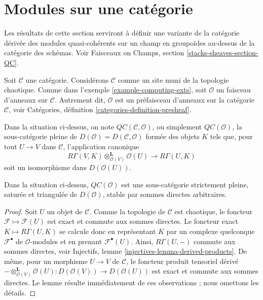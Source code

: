\section{Modules sur une catégorie}
\label{section-modules-cohomology}

\noindent
Les résultats de cette section serviront à définir une variante de la
catégorie dérivée des modules quasi-cohérents sur un champ en groupoïdes
au-dessus de la catégorie des schémas. Voir Faisceaux on Champs, section
\ref{stacks-sheaves-section-QC}.

\medskip\noindent
Soit $\mathcal{C}$ une catégorie. Considérons $\mathcal{C}$ comme un site muni
de la topologie chaotique. Comme dans l'exemple
\ref{example-computing-exts}, soit
$\mathcal{O}$ un faisceau d'anneaux sur $\mathcal{C}$. Autrement dit,
$\mathcal{O}$ est un préfaisceau d'anneaux sur la catégorie $\mathcal{C}$,
voir Catégories, définition \ref{categories-definition-presheaf}.

\begin{definition}
\label{definition-cartesian}
Dans la situation ci-dessus, on note
$\mathit{QC}(\mathcal{C}, \mathcal{O})$, ou simplement
{\it $\mathit{QC}(\mathcal{O})$}, la sous-catégorie pleine de
$D(\mathcal{O}) = D(\mathcal{C}, \mathcal{O})$ formée des objets $K$ tels que,
pour tout $U \to V$ dans $\mathcal{C}$, l'application canonique
$$
R\Gamma(V, K) \otimes_{\mathcal{O}(V)}^\mathbf{L} \mathcal{O}(U)
\longrightarrow
R\Gamma(U, K)
$$
soit un isomorphisme dans $D(\mathcal{O}(U))$.
\end{definition}

\begin{lemma}
\label{lemma-cartesian-good-sub}
Dans la situation ci-dessus, $\mathit{QC}(\mathcal{O})$ est une
sous-catégorie strictement pleine, saturée et triangulée de
$D(\mathcal{O})$, stable par sommes directes arbitraires.
\end{lemma}

\begin{proof}
Soit $U$ un objet de $\mathcal{C}$. Comme la topologie de $\mathcal{C}$ est
chaotique, le foncteur $\mathcal{F} \mapsto \mathcal{F}(U)$ est exact et
commute aux sommes directes. Le foncteur exact
$K \mapsto R\Gamma(U, K)$ se calcule donc en représentant $K$ par un complexe
quelconque $\mathcal{F}^\bullet$ de $\mathcal{O}$-modules et en prenant
$\mathcal{F}^\bullet(U)$. Ainsi, $R\Gamma(U, -)$ commute aux sommes directes,
voir Injectifs, lemme \ref{injectives-lemma-derived-products}. De même, pour
un morphisme $U \to V$ de $\mathcal{C}$, le foncteur produit tensoriel dérivé
$- \otimes_{\mathcal{O}(V)}^\mathbf{L} \mathcal{O}(U) :
D(\mathcal{O}(V)) \to D(\mathcal{O}(U))$
est exact et commute aux sommes directes. Le lemme résulte immédiatement de
ces observations ; nous omettons les détails.
\end{proof}

